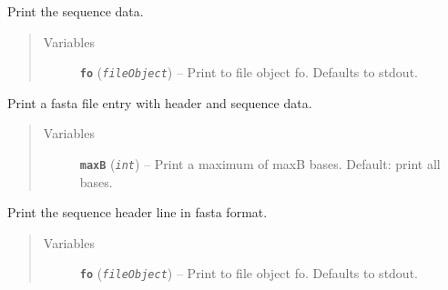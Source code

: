 \documentclass[letterpaper,10pt,english]{sphinxmanual}
\begin{document}
\begin{fulllineitems}
\begin{fulllineitems}
\label{seqbase:libPoMo.seqbase.Seq.print_data}
Print the sequence data.
\begin{quote}\begin{description}
\item[{Variables}] \leavevmode
\textbf{\texttt{fo}} (\emph{\texttt{fileObject}}) -- Print to file object fo. Defaults to
stdout.

\end{description}\end{quote}

\end{fulllineitems}


\begin{fulllineitems}
\label{seqbase:libPoMo.seqbase.Seq.print_fa_entry}
Print a fasta file entry with header and sequence data.
\begin{quote}\begin{description}
\item[{Variables}] \leavevmode
\textbf{\texttt{maxB}} (\emph{\texttt{int}}) -- Print a maximum of maxB bases. Default: print
all bases.

\end{description}\end{quote}

\end{fulllineitems}


\begin{fulllineitems}
\label{seqbase:libPoMo.seqbase.Seq.print_fa_header}
Print the sequence header line in fasta format.
\begin{quote}\begin{description}
\item[{Variables}] \leavevmode
\textbf{\texttt{fo}} (\emph{\texttt{fileObject}}) -- Print to file object fo. Defaults to
stdout.


\end{description}
\end{quote}
\end{fulllineitems}
\end{fulllineitems}
\end{document}
